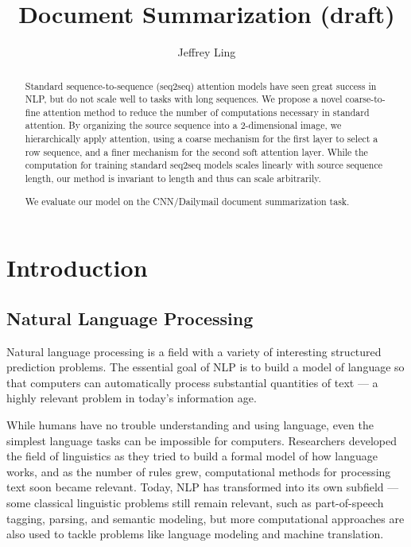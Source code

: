 \documentclass[11pt]{report}
\title{Document Summarization (draft)}
\author{Jeffrey Ling}
\begin{document}
\maketitle{}

\begin{abstract} %
Standard sequence-to-sequence (seq2seq) attention models have seen great success in NLP, but do not scale well to tasks with long sequences. We propose a novel coarse-to-fine attention method to reduce the number of computations necessary in standard attention. By organizing the source sequence into a 2-dimensional image, we hierarchically apply attention, using a coarse mechanism for the first layer to select a row sequence, and a finer mechanism for the second soft attention layer. While the computation for training standard seq2seq models scales linearly with source sequence length, our method is invariant to length and thus can scale arbitrarily.

We evaluate our model on the CNN/Dailymail document summarization task.
\end{abstract}

\tableofcontents{}




\chapter{Introduction}

\section{Natural Language Processing}

Natural language processing is a field with a variety of interesting structured prediction problems. The essential goal of NLP is to build a model of language so that computers can automatically process substantial quantities of text --- a highly relevant problem in today's information age.

While humans have no trouble understanding and using language, even the simplest language tasks can be impossible for computers. Researchers developed the field of linguistics as they tried to build a formal model of how language works, and as the number of rules grew, computational methods for processing text soon became relevant. Today, NLP has transformed into its own subfield --- some classical linguistic problems still remain relevant, such as part-of-speech tagging, parsing, and semantic modeling, but more computational approaches are also used to tackle problems like language modeling and machine translation. %
\end{document}
